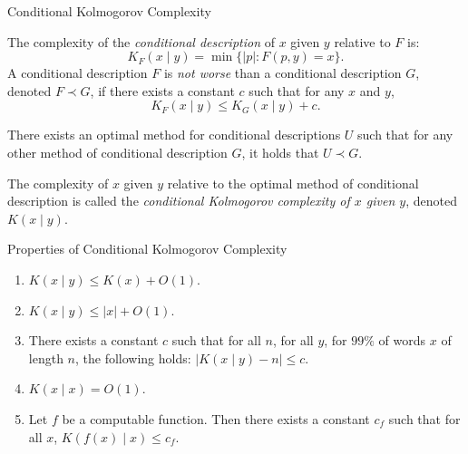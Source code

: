 \documentclass[aspectratio=169]{beamer}
\begin{document}
\begin{frame}[fragile]{Conditional Kolmogorov Complexity}
\begin{definition} The complexity of the \emph{conditional description} of $x$ given $y$ relative to $F$ is:
    \[K_F(x \mid y) = \min\{|p| : F(p,y) = x\}.\]
A conditional description $F$ is \emph{not worse} than a conditional description $G$, denoted $F \prec G$, if there exists a constant $c$ such that for any $x$ and $y$,
    \[
    K_F(x \mid y) \le K_G(x \mid y) + c.
    \]
\end{definition}\vspace{-5mm}
\pause
\begin{theorem}
    There exists an optimal method for conditional descriptions $U$ such that for any other method of conditional description $G$, it holds that $U \prec G$.
\end{theorem}
\pause
\begin{definition}
    The complexity of $x$ given $y$ relative to the optimal method of conditional description is called the \emph{conditional Kolmogorov complexity of $x$ given $y$}, denoted $K(x \mid y)$.
\end{definition}

\end{frame}

\begin{frame}{Properties of Conditional Kolmogorov Complexity}
    \begin{enumerate}
    \item $K(x \mid y) \le K(x) + O(1)$.
    \item $K(x \mid y) \le |x| + O(1)$.
    \item There exists a constant $c$ such that for all $n$, for all $y$, for $99\%$ of words $x$ of length $n$, the following holds: \(|K(x \mid y) - n| \le c\).
    \item $K(x \mid x) = O(1)$.
    \item Let $f$ be a computable function. Then there exists a constant $c_f$ such that for all $x$, $K(f(x) \mid x) \le c_f$.
\end{enumerate}
\end{frame}
\end{document}
